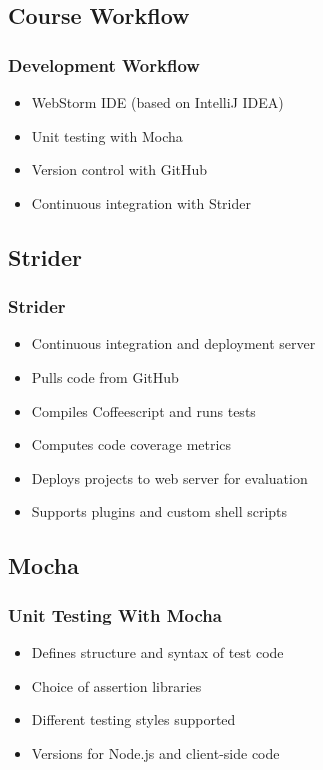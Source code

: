 \documentclass{beamer}
\begin{document}
\subsection{Course Workflow}
\begin{frame}[fragile]
\frametitle{Development Workflow}
	\begin{itemize}
  	 \item WebStorm IDE (based on IntelliJ IDEA)
	 \item Unit testing with Mocha
  	 \item Version control with GitHub
  	 \item Continuous integration with Strider
	\end{itemize}
\end{frame}

\subsection{Strider}
\begin{frame}[fragile]
\frametitle{Strider}
	\begin{itemize}
  	 \item Continuous integration and deployment server
	 \item Pulls code from GitHub
  	 \item Compiles Coffeescript and runs tests
	 \item Computes code coverage metrics
	 \item Deploys projects to web server for evaluation
  	 \item Supports plugins and custom shell scripts
	\end{itemize}
\end{frame}

\subsection{Mocha}
\begin{frame}[fragile]
\frametitle{Unit Testing With Mocha}
	\begin{itemize}
  	 \item Defines structure and syntax of test code
	 \item Choice of assertion libraries
  	 \item Different testing styles supported
	 \item Versions for Node.js and client-side code
	\end{itemize}
\end{frame}
\end{document}
